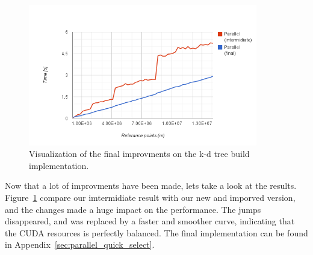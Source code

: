\begin{figure}[ht!]
\centering
\includegraphics[width=100mm]{../gfx/the_jumps_final.png}
\caption{Visualization of the final improvments on the k-d tree build implementation.}
\label{fig:the_jumps_final}
\end{figure}

Now that a lot of improvments have been made, lets take a look at the results. Figure~\ref{fig:the_jumps_final} compare our imtermidiate result with our new and imporved version, and the changes made a huge impact on the performance. The jumps disappeared, and was replaced by a faster and smoother curve, indicating that the CUDA resources is perfectly balanced. The final implementation can be found in Appendix~\ref{sec:parallel_quick_select}.










